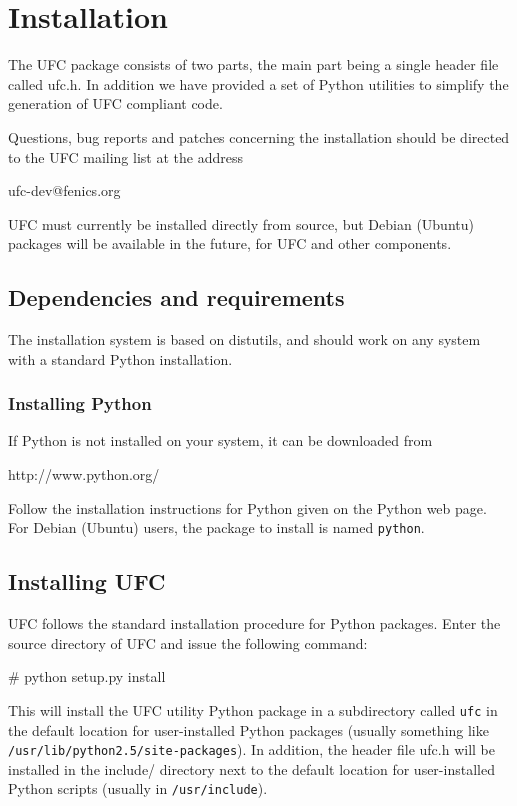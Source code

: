 \chapter{Installation}
\label{app:installation}

\newcommand{\ufc}{UFC}

The \ufc{} package consists of two parts, the main part being a single
header file called ufc.h.  In addition we have provided a set of
Python utilities to simplify the generation of \ufc{} compliant code.

Questions, bug reports and patches concerning the installation should
be directed to the \ufc{} mailing list at the address
\begin{code}
ufc-dev@fenics.org
\end{code}

\ufc{} must currently be installed directly from source, but Debian
(Ubuntu) packages will be available in the future, for \ufc{} and
other \fenics{} components.

\section{Dependencies and requirements}

The installation system is based on distutils, and should work on any
system with a standard Python installation.

\subsection{Installing Python}

If Python is not installed on your system, it can be downloaded from
\begin{code}
http://www.python.org/
\end{code}
Follow the installation instructions for Python given on the Python
web page.  For Debian (Ubuntu) users, the package to install is named
\texttt{python}.

\section{Installing \ufc{}}

\ufc{} follows the standard installation procedure for Python
packages. Enter the source directory of \ufc{} and issue the following
command:
\begin{code}
# python setup.py install
\end{code}
This will install the \ufc{} utility Python package in a subdirectory
called \texttt{ufc} in the default location for user-installed Python
packages (usually something like
\texttt{/usr/lib/python2.5/site-packages}).  In addition, the header
file ufc.h will be installed in the include/ directory next to the
default location for user-installed Python scripts (usually in
\texttt{/usr/include}).

